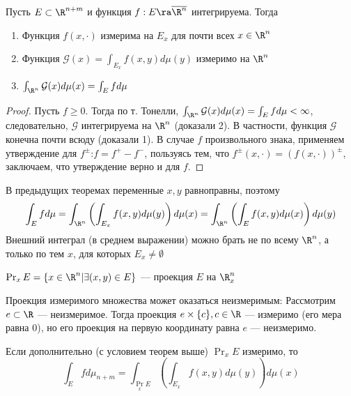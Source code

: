 \begin{theorem}[Фубини]
    Пусть \(E \subset \R^{n + m}\) и функция \(f: E \ra \overline{\R^n}\) интегрируема. Тогда
    \begin{enumerate}
        \item Функция \(f(x, \cdot)\) измерима на \(E_x\) для почти всех \(x \in \R^n\)
        \item Функция \(\mathcal{G}(x) = \int_{E_x}f(x, y)d\mu(y)\) измеримо на \(\R^n\)
        \item \(\int_{\R^n}\mathcal{G}(x)d\mu(x) = \int_E f d \mu\)
    \end{enumerate}
\end{theorem}
\begin{proof}
    Пусть \(f \ge 0\). Тогда по т. Тонелли, \(\int_{\R^n} \mathcal{G}(x)d\mu(x) = \int_E f d \mu < \infty\), следовательно, \(\mathcal{G}\) интегрируема на \(\R^n\) (доказали 2). В частности, функция \(\mathcal{G}\) конечна почти всюду (доказали 1). В случае \(f\) произвольного знака, применяем утверждение для \(f^\pm\):\(f = f^+ - f^-\), пользуясь тем, что \(f^\pm(x, \cdot) = (f(x, \cdot))^\pm\), заключаем, что утверждение верно и для \(f\).
\end{proof}

\begin{note}
    В предыдущих теоремах переменные \(x, y\) равноправны, поэтому 
    \[\int_E f d \mu = \int_{\R^n}\left(\int_{E_x}f(x, y)d\mu(y)\right)d\mu(x) = \int_{\R^n}\left(\int_E f(x, y)d\mu(x)\right)d\mu(y)\]
    Внешний интеграл (в среднем выражении) можно брать не по всему \(\R^n\), а только по тем \(x\), для которых \(E_x \ne \emptyset\)
\end{note}

\begin{definition}
    \(\Pr_xE = \{x \in \R^n | \exists (x, y) \in E\}\) --- проекция \(E\) на \(\R^n_x\)
\end{definition}

\begin{example}
    Проекция измеримого множества может оказаться неизмеримым:
    Рассмотрим \(e \subset \R\) --- неизмеримое. Тогда проекция \(e \times \{c\}, c \in \R\) --- измеримо (его мера равна 0), но его проекция на первую координату равна \(e\) --- неизмеримо.
\end{example}

\begin{corollary}
    Если дополнительно (с условием теорем выше) \(\Pr_x E\) измеримо, то 
    \[\int_E f d \mu_{n + m} = \int_{\Pr_x E} \left(\int_{E_x} f(x, y)d\mu(y)\right)d\mu(x)\]
\end{corollary}

